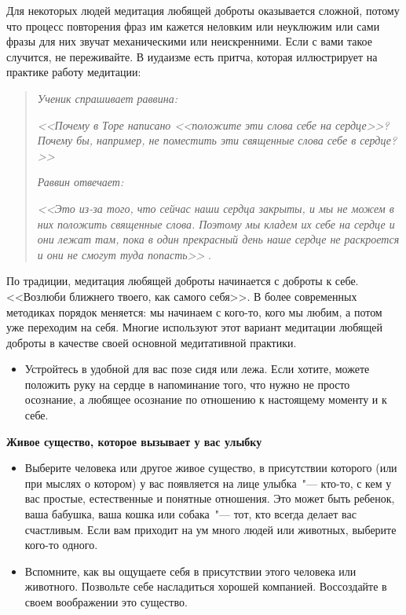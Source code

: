 Для некоторых людей медитация любящей доброты оказывается сложной, потому что процесс повторения фраз им кажется неловким или неуклюжим или сами фразы для них звучат механическими или неискренними. Если с вами такое случится, не переживайте. В иудаизме есть притча, которая иллюстрирует на практике работу медитации:

\begin{quotation}
	\textit{Ученик спрашивает раввина:}
	
	\textit{
		<<Почему в Торе написано <<положите эти слова себе на сердце>>? Почему бы, например, не поместить эти священные слова себе в сердце?>>
	}

	\textit{Раввин отвечает:}
	 
	\textit{
		<<Это из-за того, что сейчас наши сердца закрыты, и мы не можем в них положить священные слова. Поэтому мы кладем их себе на сердце и они лежат там, пока в один прекрасный день наше сердце не раскроется и они не смогут туда попасть>>
	}.\cite{71}
\end{quotation}

\newpage
{} \label{M:Loving-Kindness_for_a_Loved_One}

По традиции, медитация любящей доброты начинается с доброты к себе. <<Возлюби ближнего твоего, как самого себя>>. В более современных методиках порядок меняется: мы начинаем с кого-то, кого мы любим, а потом уже переходим на себя. Многие используют этот вариант медитации любящей доброты в качестве своей основной медитативной практики.

\begin{itemize}
	\item Устройтесь в удобной для вас позе сидя или лежа. Если хотите, можете положить руку на сердце в напоминание того, что нужно не просто осознание, а любящее осознание по отношению к настоящему моменту и к себе. 
\end{itemize}

\vspace{3ex}

{\large \textbf{Живое существо, которое вызывает у вас улыбку}}
\begin{itemize}
	\item Выберите человека или другое живое существо, в присутствии которого (или при мыслях о котором) у вас появляется на лице улыбка~"--- кто-то, с кем у вас простые, естественные и понятные отношения. Это может быть ребенок, ваша бабушка, ваша кошка или собака~"--- тот, кто всегда делает вас счастливым. Если вам приходит на ум много людей или животных, выберите кого-то одного.
	
	\item Вспомните, как вы ощущаете себя в присутствии этого человека или животного. Позвольте себе насладиться хорошей компанией. Воссоздайте в своем воображении это существо.
\end{itemize}

